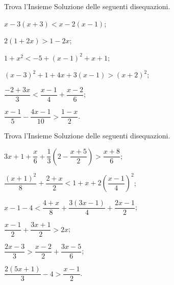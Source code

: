 \begin{esercizio}[\Ast]
 \label{ese:20.15}
Trova l'Insieme Soluzione delle seguenti disequazioni.
 \begin{multicols}{2}
 \begin{enumeratea}
\item $x-3(x+3)<x-2(x-1)$;
\item $2(1+2x)>1-2x$;
\item $1+x^{2}<-5+(x-1)^{2}+x+1$;
\item $(x-3)^{2}+1+4x+3(x-1)>(x+2)^{2}$;
\item $\dfrac{-2+3x}{3}<\dfrac{x-1}{4}+\dfrac{x-2}{6}$;
\item $\dfrac{x-1}{5}-\dfrac{4x-1}{10}>\dfrac{1-x}{2}$.
\end{enumeratea}
\end{multicols}
\end{esercizio}

\begin{esercizio}[\Ast]
 \label{ese:20.16}
Trova l'Insieme Soluzione delle seguenti disequazioni.
 \begin{multicols}{2}
 \begin{enumeratea}
\item $3x+1+\dfrac{x}{6}+\dfrac{1}{3}\left(2-\dfrac{x+5}{2}\right)>\dfrac{x+8}{6}$;
\item $\dfrac{(x+1)^{2}}{8}+\dfrac{2+x}{2}<1+x+2\left(\dfrac{x-1}{4}\right)^{2}$;
\item $x-1-4<\dfrac{4+x}{8}+\dfrac{3(3x-1)}{4}+\dfrac{2x-1}{2}$;
\item $\dfrac{x-1}{2}+\dfrac{3x+1}{2}>2x$;
\item $\dfrac{2x-3}{3}>\dfrac{x-2}{2}+\dfrac{3x-5}{6}$;
\item $\dfrac{2(5x+1)}{3}-4>\dfrac{x-1}{2}$.
\end{enumeratea}
\end{multicols}
\end{esercizio}

